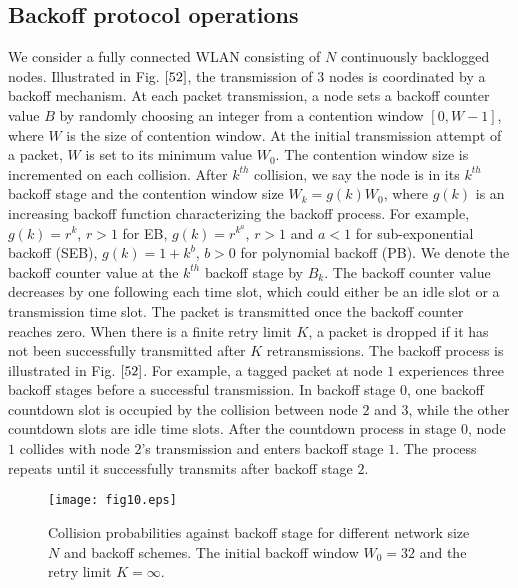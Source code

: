 \documentclass[journal]{IEEEtran}
\begin{document}
\subsection{Backoff protocol operations}
We consider a fully connected WLAN consisting of $N$ continuously backlogged nodes. Illustrated in Fig. $\ref{52}$, the transmission of $3$ nodes is coordinated by a backoff mechanism. At each packet transmission, a node sets a backoff counter value $B$ by randomly choosing an integer from a contention window $[0, W-1]$, where $W$ is the size of contention window. At the initial transmission attempt of a packet, $W$ is set to its minimum value $W_0$. The contention window size is incremented on each collision. After $k^{th}$ collision, we say the node is in its $k^{th}$ backoff stage and the contention window size $W_k=g(k)W_0$, where $g(k)$ is an increasing backoff function characterizing the backoff process. For example, $g(k)=r^k$, $r > 1$ for EB, $g(k)=r^{k^a}$, $r > 1$ and $a<1$ for sub-exponential backoff (SEB), $g(k)=1+ k^b$, $b>0$ for polynomial backoff (PB). We denote the backoff counter value at the $k^{th}$ backoff stage by $B_k$. The backoff counter value decreases by one following each time slot, which could either be an idle slot or a transmission time slot. The packet is transmitted once the backoff counter reaches zero. When there is a finite retry limit $K$, a packet is dropped if it has not been successfully transmitted after $K$ retransmissions. The backoff process is illustrated in Fig. $\ref{52}$. For example, a tagged packet at node $1$ experiences three backoff stages before a successful transmission. In backoff stage $0$, one backoff countdown slot is occupied by the collision between node $2$ and $3$, while the other countdown slots are idle time slots. After the countdown process in stage $0$, node $1$ collides with node $2$'s transmission and enters backoff stage $1$. The process repeats until it successfully transmits after backoff stage $2$.

\begin{figure}
\centering
  \begin{center}
    \texttt{[image: fig10.eps]}
  \end{center}
  \caption{Collision probabilities against backoff stage for different network size $N$ and backoff schemes. The initial backoff window $W_0=32$ and the retry limit $K=\infty$.}
  \label{60}
\end{figure}
\end{document}
